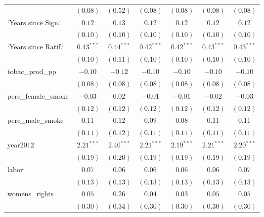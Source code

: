 \begin{table}[!h]
\begin{center}
\begin{tabular}{l c c c c c c }
                        & $(0.08)$     & $(0.52)$     & $(0.08)$     & $(0.08)$     & $(0.08)$     & $(0.08)$     \\
`Years since Sign.`     & $0.12$       & $0.13$       & $0.12$       & $0.12$       & $0.12$       & $0.12$       \\
                        & $(0.10)$     & $(0.10)$     & $(0.10)$     & $(0.10)$     & $(0.10)$     & $(0.10)$     \\
`Years since Ratif.`    & $0.43^{***}$ & $0.44^{***}$ & $0.42^{***}$ & $0.42^{***}$ & $0.43^{***}$ & $0.43^{***}$ \\
                        & $(0.10)$     & $(0.11)$     & $(0.10)$     & $(0.10)$     & $(0.10)$     & $(0.10)$     \\
tobac\_prod\_pp         & $-0.10$      & $-0.12$      & $-0.10$      & $-0.10$      & $-0.10$      & $-0.10$      \\
                        & $(0.08)$     & $(0.08)$     & $(0.08)$     & $(0.08)$     & $(0.08)$     & $(0.08)$     \\
perc\_female\_smoke     & $-0.03$      & $0.02$       & $-0.01$      & $-0.01$      & $-0.02$      & $-0.03$      \\
                        & $(0.12)$     & $(0.12)$     & $(0.12)$     & $(0.12)$     & $(0.12)$     & $(0.12)$     \\
perc\_male\_smoke       & $0.11$       & $0.12$       & $0.09$       & $0.08$       & $0.11$       & $0.11$       \\
                        & $(0.11)$     & $(0.12)$     & $(0.11)$     & $(0.11)$     & $(0.11)$     & $(0.11)$     \\
year2012                & $2.21^{***}$ & $2.40^{***}$ & $2.21^{***}$ & $2.19^{***}$ & $2.21^{***}$ & $2.20^{***}$ \\
                        & $(0.19)$     & $(0.20)$     & $(0.19)$     & $(0.19)$     & $(0.19)$     & $(0.19)$     \\
labor                   & $0.07$       & $0.06$       & $0.06$       & $0.06$       & $0.06$       & $0.07$       \\
                        & $(0.13)$     & $(0.13)$     & $(0.13)$     & $(0.13)$     & $(0.13)$     & $(0.13)$     \\
womens\_rights          & $0.05$       & $0.26$       & $0.04$       & $0.03$       & $0.05$       & $0.05$       \\
                        & $(0.30)$     & $(0.34)$     & $(0.30)$     & $(0.30)$     & $(0.30)$     & $(0.30)$     \\

\end{tabular}
\end{center}
\end{table}
